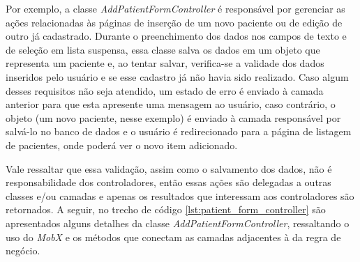 Por exemplo, a classe \textit{AddPatientFormController} é responsável por gerenciar as ações relacionadas às páginas de inserção de um novo paciente ou de edição de outro já cadastrado. Durante o preenchimento dos dados nos campos de texto e de seleção em lista suspensa, essa classe salva os dados em um objeto que representa um paciente e, ao tentar salvar, verifica-se a validade dos dados inseridos pelo usuário e se esse cadastro já não havia sido realizado. Caso algum desses requisitos não seja atendido, um estado de erro é enviado à camada anterior para que esta apresente uma mensagem ao usuário, caso contrário, o objeto (um novo paciente, nesse exemplo) é enviado à camada responsável por salvá-lo no banco de dados e o usuário é redirecionado para a página de listagem de pacientes, onde poderá ver o novo item adicionado.

Vale ressaltar que essa validação, assim como o salvamento dos dados, não é responsabilidade dos controladores, então essas ações são delegadas a outras classes e/ou camadas e apenas os resultados que interessam aos controladores são retornados. A seguir, no trecho de código \ref{lst:patient_form_controller} são apresentados alguns detalhes da classe \textit{AddPatientFormController}, ressaltando o uso do \textit{MobX} e os métodos que conectam as camadas adjacentes à da regra de negócio.


